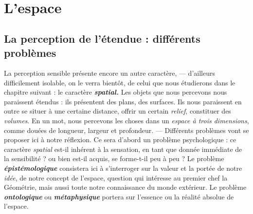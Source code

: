 
\chapter{L'espace}

\section{La perception de l'étendue : différents problèmes}%
La perception sensible présente encore un autre caractère, — d'ailleurs
difficilement isolable, on le verra bientôt, de celui que nous étudierons
dans le chapitre suivant : le caractère \textbf{\textit {spatial.}} Les objets que nous
percevons nous paraissent {\it }étendus : ils présentent des plans, des
surfaces. Ils nous paraissent en outre se situer à une certaine {\it }distance,
offrir un certain {\it relief}, constituer des {\it volumes}. En un mot, nous percevons
les choses dans un {\it espace à trois dimensions}, comme douées de
longueur, largeur et profondeur. — Différents problèmes vont se
proposer ici à notre réflexion. Ce sera d’abord un problème psychologique :
ce caractère {\it spatial} est-il inhérent à la sensation, en tant
que donnée immédiate de la sensibilité ? ou bien est-il acquis, se forme-t-il
peu à peu ? Le problème \textbf{\textit {épistémologique}} consistera ici à s'interroger
sur la valeur et la portée de notre {\it idée}, de notre concept de l'espace,
question qui intéresse au premier chef la Géométrie, mais aussi toute
notre connaissance du monde extérieur. Le problème \textbf{\textit {ontologique}} ou
\textbf{\textit {métaphysique}} portera sur l’essence ou la réalité absolue de l’espace.

